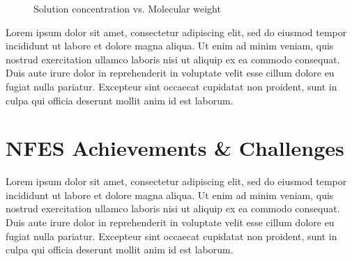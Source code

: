 \documentclass[5p,,preprint,12pt,twocolumn]{elsarticle}
\makeatletter
\def\fixFloatSize#1{}%
\makeatother
\begin{document}
\bgroup
\fixFloatSize{images/fbd73f28-2c70-4a0a-be0b-f58ca8eab694-uweightconcentrationplot.png}
\begin{figure}[!htbp]
\centering \makeatletter{}
\makeatother 
\caption{{Solution concentration vs. Molecular weight}}
\label{f-ab38f7e015f7}
\end{figure}
\egroup
Lorem ipsum dolor sit amet, consectetur adipiscing elit, sed do eiusmod tempor incididunt ut labore et dolore magna aliqua. Ut enim ad minim veniam, quis nostrud exercitation ullamco laboris nisi ut aliquip ex ea commodo consequat. Duis aute irure dolor in reprehenderit in voluptate velit esse cillum dolore eu fugiat nulla pariatur. Excepteur sint occaecat cupidatat non proident, sunt in culpa qui officia deserunt mollit anim id est laborum.
    
\section{NFES Achievements \& Challenges}
Lorem ipsum dolor sit amet, consectetur adipiscing elit, sed do eiusmod tempor incididunt ut labore et dolore magna aliqua. Ut enim ad minim veniam, quis nostrud exercitation ullamco laboris nisi ut aliquip ex ea commodo consequat. Duis aute irure dolor in reprehenderit in voluptate velit esse cillum dolore eu fugiat nulla pariatur. Excepteur sint occaecat cupidatat non proident, sunt in culpa qui officia deserunt mollit anim id est laborum.
    






\end{document}
